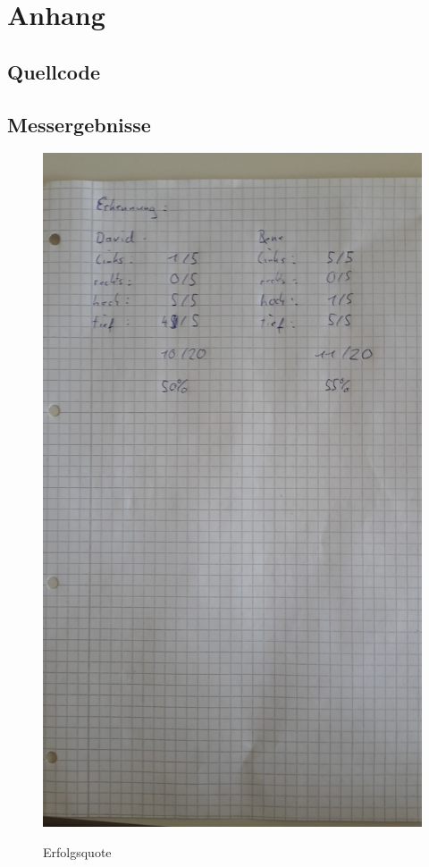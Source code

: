 \documentclass[TGAI_Laborbericht.tex]{subfiles}
\begin{document}
\chapter*{Anhang}
\label{chap:APPENDIX}
\addtocounter{chapter}{1}
\setcounter{section}{0}

\section{Quellcode}
\label{chap:APPENDIX_SOURCECODE}




\section{Messergebnisse}
\label{chap:APPENDIX_MEASUREMENT_SOURCE}
\begin{figure}[H]
	\includegraphics[width=2\textwidth, angle=-90]{media/messergebnisse.jpg}
	\label{Erfolgsquote}
	\caption{Erfolgsquote}
\end{figure}
\end{document}
